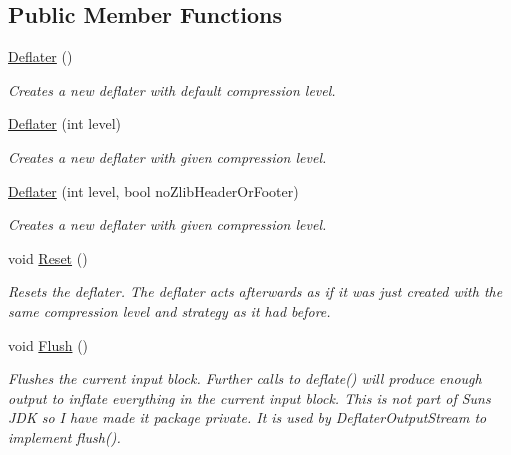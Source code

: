 \subsection*{Public Member Functions}
\begin{DoxyCompactItemize}
\item 
\hyperlink{class_i_c_sharp_code_1_1_sharp_zip_lib_1_1_zip_1_1_compression_1_1_deflater_aef92661d02455221261ea607e29710f2}{Deflater} ()
\begin{DoxyCompactList}\small\item\em Creates a new deflater with default compression level. \end{DoxyCompactList}\item 
\hyperlink{class_i_c_sharp_code_1_1_sharp_zip_lib_1_1_zip_1_1_compression_1_1_deflater_a038451ce25b9917398218c5c741e9fb2}{Deflater} (int level)
\begin{DoxyCompactList}\small\item\em Creates a new deflater with given compression level. \end{DoxyCompactList}\item 
\hyperlink{class_i_c_sharp_code_1_1_sharp_zip_lib_1_1_zip_1_1_compression_1_1_deflater_a8bfca90e822ab3e9984ad3287e95a61a}{Deflater} (int level, bool no\+Zlib\+Header\+Or\+Footer)
\begin{DoxyCompactList}\small\item\em Creates a new deflater with given compression level. \end{DoxyCompactList}\item 
void \hyperlink{class_i_c_sharp_code_1_1_sharp_zip_lib_1_1_zip_1_1_compression_1_1_deflater_a61fe4fb8d97829e1910afbe6fd8be79c}{Reset} ()
\begin{DoxyCompactList}\small\item\em Resets the deflater. The deflater acts afterwards as if it was just created with the same compression level and strategy as it had before. \end{DoxyCompactList}\item 
void \hyperlink{class_i_c_sharp_code_1_1_sharp_zip_lib_1_1_zip_1_1_compression_1_1_deflater_a98a7b88b7209a07bcd5f69ab94863116}{Flush} ()
\begin{DoxyCompactList}\small\item\em Flushes the current input block. Further calls to deflate() will produce enough output to inflate everything in the current input block. This is not part of Sun\textquotesingle{}s J\+DK so I have made it package private. It is used by Deflater\+Output\+Stream to implement flush(). \end{DoxyCompactList}\item 

\end{DoxyCompactItemize}
